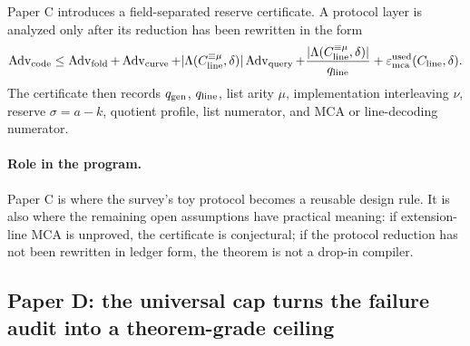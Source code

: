 \documentclass[11pt]{article}
\theoremstyle{definition}
\theoremstyle{remark}
\newcommand{\Int}[2]{#1^{\equiv #2}}
\newcommand{\Adv}{\operatorname{Adv}}
\newcommand{\qgen}{q_{\rm gen}}
\newcommand{\qline}{q_{\rm line}}
\newcommand{\paperC}{Paper C}
\newcommand{\paperD}{Paper D}
\begin{document}
\paperC{} introduces a field-separated reserve certificate.  A protocol layer is analyzed only after its reduction has been rewritten in the form
\begin{equation}
\label{eq:blueprint-protocol-reduction}
        \Adv_{\rm code}
        \le \Adv_{\rm fold}+\Adv_{\rm curve}
        + |\Lambda(\Int{C_{\rm line}}{\mu},\delta)|\Adv_{\rm query}
        + \frac{|\Lambda(\Int{C_{\rm line}}{\mu},\delta)|}{\qline}
        + \varepsilon_{\rm mca}^{\rm used}(C_{\rm line},\delta).
\end{equation}
The certificate then records $\qgen$, $\qline$, list arity $\mu$, implementation interleaving $\nu$, reserve $\sigma=a-k$, quotient profile, list numerator, and MCA or line-decoding numerator.

\paragraph{Role in the program.}  \paperC{} is where the survey's toy protocol becomes a reusable design rule.  It is also where the remaining open assumptions have practical meaning: if extension-line MCA is unproved, the certificate is conjectural; if the protocol reduction has not been rewritten in ledger form, the theorem is not a drop-in compiler.

\subsection{\paperD: the universal cap turns the failure audit into a theorem-grade ceiling}
\end{document}
